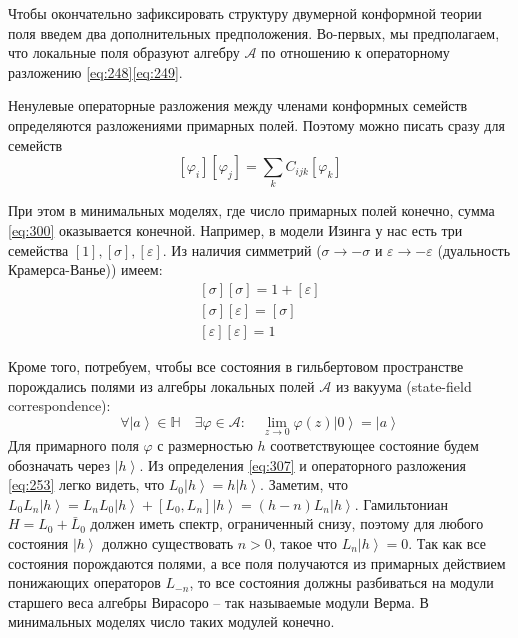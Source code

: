 \documentclass[a4paper,12pt]{article}
\theoremstyle{definition}
\theoremstyle{definition}
\theoremstyle{definition}
\begin{document}
Чтобы окончательно зафиксировать структуру двумерной конформной теории поля введем два
дополнительных предположения. Во-первых, мы предполагаем, что локальные поля образуют алгебру
$\mathcal{A}$ по отношению к операторному разложению \eqref{eq:248}\eqref{eq:249}.


Ненулевые операторные разложения между членами конформных семейств определяются разложениями примарных полей. Поэтому можно писать сразу для семейств
\begin{equation}
  \label{eq:300}
  [\varphi_i][\varphi_j]=\sum_k C_{ijk} [\varphi_k]
\end{equation}

При этом в минимальных моделях, где число примарных полей конечно, сумма \eqref{eq:300} оказывается конечной.
Например, в модели Изинга у нас есть три семейства $[1], [\sigma], [\varepsilon]$. Из наличия симметрий ($\sigma\to - \sigma$ и $\varepsilon\to -\varepsilon$ (дуальность Крамерса-Ванье)) имеем:
\begin{eqnarray}
  \label{eq:301}
  \left[\sigma\right]\left[\sigma\right]=1+\left[\varepsilon\right]\\
  \left[\sigma\right]\left[\varepsilon\right]=\left[\sigma\right]\\
  \left[\varepsilon\right]\left[\varepsilon\right]=1
\end{eqnarray}

Кроме того, потребуем, чтобы все состояния в гильбертовом пространстве порождались полями из алгебры локальных полей $\mathcal{A}$ из вакуума (state-field correspondence):
\begin{equation}
  \label{eq:307}
  \forall \left| a\right> \in \mathbb{H}\quad \exists \varphi\in\mathcal{A}:\quad \lim_{z\to 0}\varphi(z)\left|0\right>=\left|a\right>
\end{equation}
Для примарного поля $\varphi$ с размерностью $h$ соответствующее состояние будем обозначать через $\left|h\right>$. 
Из определения \eqref{eq:307} и операторного разложения \eqref{eq:253} легко видеть, что $L_{0}\left|h\right>=h\left|h\right>$.
Заметим, что $L_{0} L_{n}\left|h\right> = L_{n} L_{0}\left|h\right> + [L_{0},L_{n}]\left|h\right> = (h-n) L_{n}\left|h\right>$. 
Гамильтониан $H=L_{0}+\bar L_{0}$ должен иметь спектр, ограниченный снизу, поэтому для любого состояния $\left|h\right>$ должно существовать $n>0$, такое что $L_{n}\left|h\right> =0 $.
Так как все состояния порождаются полями, а все поля получаются из примарных действием понижающих операторов $L_{-n}$, то все состояния должны разбиваться на модули старшего веса алгебры Вирасоро -- так называемые модули Верма. В минимальных моделях число таких модулей конечно. 
\end{document}
